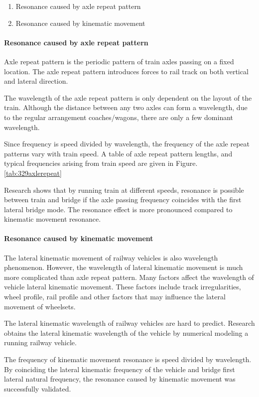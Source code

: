 \begin{enumerate}
    \item Resonance caused by axle repeat pattern
    \item Resonance caused by kinematic movement
\end{enumerate}

\paragraph{Resonance caused by axle repeat pattern}
Axle repeat pattern is the periodic pattern of train axles passing on a fixed location. The axle repeat pattern introduces forces to rail track on both vertical and lateral direction. 

The wavelength of the axle repeat pattern is only dependent on the layout of the train. Although the distance between any two axles can form a wavelength, due to the regular arrangement coaches/wagons, there are only a few dominant wavelength. 

Since frequency is speed divided by wavelength, the frequency of the axle repeat patterns vary with train speed. A table of axle repeat pattern lengths, and typical frequencies arising from train speed are given in Figure.\ref{tab:329axlerepeat}

Research\citep[3.4.3]{d181dt329} shows that by running train at different speeds, resonance is possible between train and bridge if the axle passing frequency coincides with the first lateral bridge mode. The resonance effect is more pronounced compared to kinematic movement resonance\citep[Chapter 5, Research Phase II]{d181dt329}.

\paragraph{Resonance caused by kinematic movement}
The lateral kinematic movement of railway vehicles is also wavelength phenomenon. However, the wavelength of lateral kinematic movement is much more complicated than axle repeat pattern. Many factors affect the wavelength of vehicle lateral kinematic movement. These factors include track irregularities, wheel profile, rail profile and other factors that may influence the lateral movement of wheelsets.

The lateral kinematic wavelength of railway vehicles are hard to predict. Research\citep{d181dt329} obtains the lateral kinematic wavelength of the vehicle by numerical modeling a running railway vehicle. 

The frequency of kinematic movement resonance is speed divided by wavelength. By coinciding the lateral kinematic frequency of the vehicle and bridge first lateral natural frequency, the resonance caused by kinematic movement was successfully validated\citep{d181dt329}.

 
